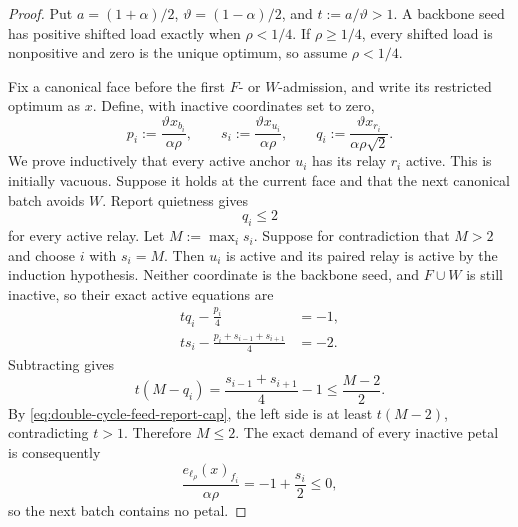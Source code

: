 \begin{proof}
Put $a=(1+\alpha)/2$, $\vartheta=(1-\alpha)/2$, and
$t:=a/\vartheta>1$.  A backbone seed has positive shifted load exactly when
$\rho<1/4$.  If $\rho\geq1/4$, every shifted load is nonpositive and zero is
the unique optimum, so assume $\rho<1/4$.

Fix a canonical face before the first $F$- or $W$-admission, and write its
restricted optimum as $x$.  Define, with inactive coordinates set to zero,
\begin{equation}
 p_i:=\frac{\vartheta x_{b_i}}{\alpha\rho},\qquad
 s_i:=\frac{\vartheta x_{u_i}}{\alpha\rho},\qquad
 q_i:=\frac{\vartheta x_{r_i}}{\alpha\rho\sqrt2}.
 \label{eq:double-cycle-feed-normalization}
\end{equation}
We prove inductively that every active anchor $u_i$ has its relay $r_i$
active.  This is initially vacuous.  Suppose it holds at the current face and
that the next canonical batch avoids $W$.  Report quietness gives
\begin{equation}
q_i\leq2
 \label{eq:double-cycle-feed-report-cap}
\end{equation}
for every active relay.  Let $M:=\max_i s_i$.  Suppose for contradiction that
$M>2$ and choose $i$ with $s_i=M$.  Then $u_i$ is active and its paired relay
is active by the induction hypothesis.  Neither coordinate is
the backbone seed, and $F\cup W$ is still inactive, so their exact active
equations are
\begin{align}
 t q_i-\frac{p_i}{4}&=-1,
 \label{eq:double-cycle-feed-relay-equation}\\
 t s_i-\frac{p_i+s_{i-1}+s_{i+1}}4&=-2.
 \label{eq:double-cycle-feed-anchor-equation}
\end{align}
Subtracting gives
\begin{equation}
 t(M-q_i)=\frac{s_{i-1}+s_{i+1}}4-1
 \leq\frac{M-2}{2}.
 \label{eq:double-cycle-feed-maximum-inequality}
\end{equation}
By \cref{eq:double-cycle-feed-report-cap}, the left side is at least
$t(M-2)$, contradicting $t>1$.  Therefore $M\leq2$.  The exact demand
of every inactive petal is consequently
\begin{equation}
 \frac{e_{\ell_\rho}(x)_{f_i}}{\alpha\rho}
 =-1+\frac{s_i}{2}\leq0,
 \label{eq:double-cycle-feed-petal-quiet}
\end{equation}
so the next batch contains no petal.


\end{proof}
